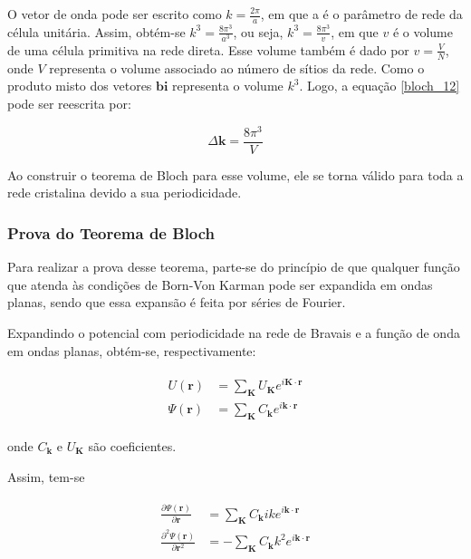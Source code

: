 		\par O vetor de onda pode ser escrito como $k=\frac{2\pi}{a}$, em que a é o parâmetro de rede da célula unitária. Assim, obtém-se $k^3=\frac{8\pi^3}{a^3}$, ou seja, $k^3=\frac{8\pi^3}{v}$, em que $v$ é o volume de uma célula primitiva na rede direta. Esse volume também é dado por $v=\frac{V}{N}$, onde $V$ representa o volume associado ao número de sítios da rede. Como o produto misto dos vetores $\mathbf{bi}$ representa o volume $k^3$. Logo, a equação \eqref{bloch_12} pode ser reescrita por:

		\begin{equation}
			\label{bloch_13}
			\Delta \mathbf{k} = \frac{8\pi^3}{V}
		\end{equation}

		\par Ao construir o teorema de Bloch para esse volume, ele se torna válido para toda a rede cristalina devido a sua periodicidade.

	\subsubsection{Prova do Teorema de Bloch}

	\par Para realizar a prova desse teorema, parte-se do princípio de que qualquer função que atenda às condições de Born-Von Karman pode ser expandida em ondas planas, sendo que essa expansão é feita por séries de Fourier. 
	
	\par Expandindo o potencial com periodicidade na rede de Bravais e a função de onda em ondas planas, obtém-se, respectivamente: 

	\begin{align}\label{bloch_14}
	      \begin{array}{ll}
	        \displaystyle U(\mathbf{r}) &= \sum_{\mathbf{K}} U_{\mathbf{K}} e^{i\mathbf{K}\cdot \mathbf{r}}\\
	        \displaystyle \Psi(\mathbf{r}) &= \sum_{\mathbf{K}} C_{\mathbf{k}} e^{i\mathbf{k}\cdot \mathbf{r}}	            
	      \end{array}
  \end{align}

	onde $C_{\textbf{k}}$ e $U_{\textbf{K}}$ são coeficientes.

	\par Assim, tem-se

	\begin{align}\label{bloch_15}
	      \begin{array}{ll}
	        \displaystyle \frac{\partial \Psi(\mathbf{r})}{\partial\mathbf{r}} &= \sum_{\mathbf{K}} C_{\mathbf{k}} ik e^{i\mathbf{k}\cdot \mathbf{r}}\\
	        \displaystyle \frac{\partial^2 \Psi(\mathbf{r})}{\partial\mathbf{r}^2} &= -\sum_{\mathbf{K}} C_{\mathbf{k}} k^2 e^{i\mathbf{k}\cdot \mathbf{r}}	            
	      \end{array}
  \end{align}

